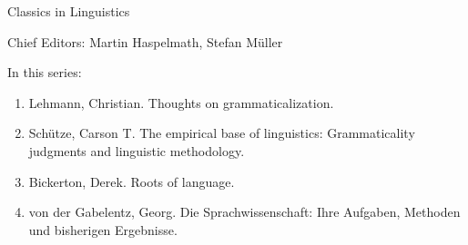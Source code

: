 {\large Classics in Linguistics}

\bigskip

Chief Editors: Martin Haspelmath, Stefan Müller

\bigskip

In this series:

\begin{enumerate}
\item Lehmann, Christian. Thoughts on grammaticalization.
\item Schütze, Carson T. The empirical base of linguistics: Grammaticality judgments and linguistic methodology.
\item Bickerton, Derek. Roots of language.
\item von der Gabelentz, Georg. Die Sprachwissenschaft:  Ihre Aufgaben, Methoden und bisherigen Ergebnisse.
\end{enumerate}


\vfill

